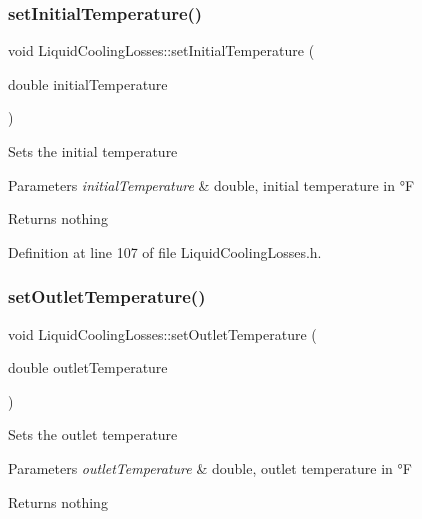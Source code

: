 \subsubsection{\texorpdfstring{set\+Initial\+Temperature()}{setInitialTemperature()}\hspace{0.1cm}{\footnotesize\ttfamily [3/3]}}
{\footnotesize\ttfamily void Liquid\+Cooling\+Losses\+::set\+Initial\+Temperature (\begin{DoxyParamCaption}\item[{double}]{initial\+Temperature }\end{DoxyParamCaption})\hspace{0.3cm}{\ttfamily [inline]}}

Sets the initial temperature


\begin{DoxyParams}{Parameters}
{\em initial\+Temperature} & double, initial temperature in °F\\
\hline
\end{DoxyParams}
\begin{DoxyReturn}{Returns}
nothing 
\end{DoxyReturn}


Definition at line 107 of file Liquid\+Cooling\+Losses.\+h.

\mbox{\label{class_liquid_cooling_losses_ab8ea8e748853e18fa480afa0b3e417ee}} 
\subsubsection{\texorpdfstring{set\+Outlet\+Temperature()}{setOutletTemperature()}\hspace{0.1cm}{\footnotesize\ttfamily [1/3]}}
{\footnotesize\ttfamily void Liquid\+Cooling\+Losses\+::set\+Outlet\+Temperature (\begin{DoxyParamCaption}\item[{double}]{outlet\+Temperature }\end{DoxyParamCaption})\hspace{0.3cm}{\ttfamily [inline]}}

Sets the outlet temperature


\begin{DoxyParams}{Parameters}
{\em outlet\+Temperature} & double, outlet temperature in °F\\
\hline
\end{DoxyParams}
\begin{DoxyReturn}{Returns}
nothing 
\end{DoxyReturn}


